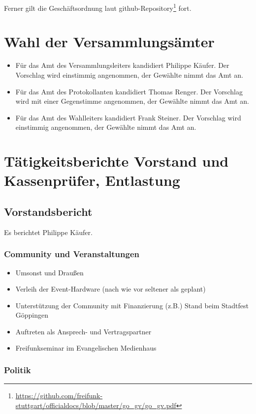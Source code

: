 \documentclass[a4paper]{scrartcl}
\begin{document}
Ferner gilt die Geschäftsordnung laut github-Repository\footnote{\url{https://github.com/freifunk-stuttgart/officialdocs/blob/master/go_gv/go_gv.pdf}} fort.

\section{Wahl der Versammlungsämter}
\begin{itemize}
\item Für das Amt des Versammlungsleiters kandidiert Philippe Käufer. Der Vorschlag wird einstimmig angenommen, der Gewählte nimmt das Amt an.
\item Für das Amt des Protokollanten kandidiert Thomas Renger. Der Vorschlag wird mit einer Gegenstimme angenommen, der Gewählte nimmt das Amt an.
\item Für das Amt des Wahlleiters kandidiert Frank Steiner. Der Vorschlag wird einstimmig angenommen, der Gewählte nimmt das Amt an.
\end{itemize}

\section{Tätigkeitsberichte Vorstand und Kassenprüfer, Entlastung}
\subsection{Vorstandsbericht}
Es berichtet Philippe Käufer.

\subsubsection{Community und Veranstaltungen}
\begin{itemize}
\item Umsonst und Draußen
\item Verleih der Event-Hardware (nach wie vor seltener als geplant)
\item Unterstützung der Community mit Finanzierung (z.B.) Stand beim Stadtfest Göppingen
\item Auftreten als Ansprech- und Vertragspartner
\item Freifunkseminar im Evangelischen Medienhaus
\end{itemize}

\subsubsection{Politik}
\end{document}
